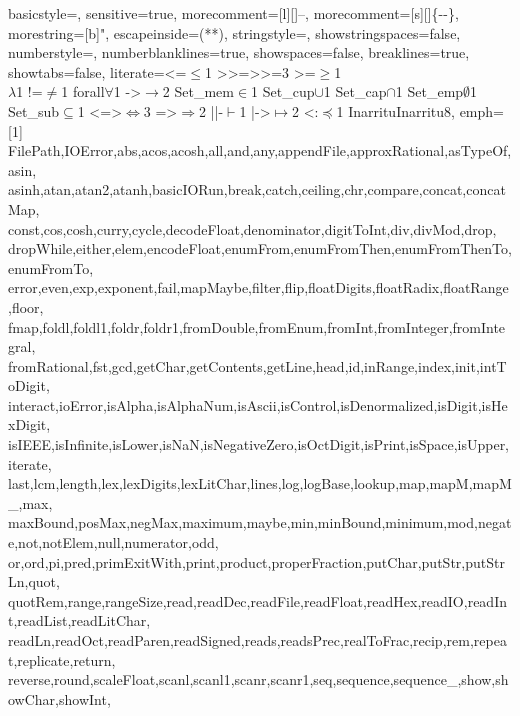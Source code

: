  {
	basicstyle=\ttfamily\codesize,
	sensitive=true,
	morecomment=[l][\color{gray_ulisses}\ttfamily\codesize]{--},
	morecomment=[s][\color{gray_ulisses}\ttfamily\codesize]{\{-}{-\}},
	morestring=[b]",
  escapeinside={(*}{*)},
	stringstyle=\color{haskellstr},
	showstringspaces=false,
	numberstyle=\codesize,
	numberblanklines=true,
	showspaces=false,
	breaklines=true,
	showtabs=false,
  literate={<=}{{$\leq$}}1
           {>>=}{{>>=}}3
           {>=}{{$\geq$}}1
           {\\}{{$\lambda$}}1
           {!=}{{$\neq$}}1
           {forall}{{$\forall$}}1
           {->}{{$\rightarrow$}}2
           {Set_mem}{{$\in$}}1
           {Set_cup}{{$\cup$}}1
           {Set_cap}{{$\cap$}}1
           {Set_emp}{{$\emptyset$}}1
           {Set_sub}{{$\subseteq$}}1
           {<=>}{{$\Leftrightarrow$}}3
           {=>}{{$\Rightarrow$}}2
           {||-}{{$\vdash$}}1
           {|->}{{$\mapsto$}}2
           {<:}{{$\preceq$}}1
           {Inarritu}{Inarritu}8,  
	emph=
	{[1]
		FilePath,IOError,abs,acos,acosh,all,and,any,appendFile,approxRational,asTypeOf,asin,
		asinh,atan,atan2,atanh,basicIORun,break,catch,ceiling,chr,compare,concat,concatMap,
		const,cos,cosh,curry,cycle,decodeFloat,denominator,digitToInt,div,divMod,drop,
		dropWhile,either,elem,encodeFloat,enumFrom,enumFromThen,enumFromThenTo,enumFromTo,
		error,even,exp,exponent,fail,mapMaybe,filter,flip,floatDigits,floatRadix,floatRange,floor,
		fmap,foldl,foldl1,foldr,foldr1,fromDouble,fromEnum,fromInt,fromInteger,fromIntegral,
		fromRational,fst,gcd,getChar,getContents,getLine,head,id,inRange,index,init,intToDigit,
		interact,ioError,isAlpha,isAlphaNum,isAscii,isControl,isDenormalized,isDigit,isHexDigit,
		isIEEE,isInfinite,isLower,isNaN,isNegativeZero,isOctDigit,isPrint,isSpace,isUpper,iterate,
		last,lcm,length,lex,lexDigits,lexLitChar,lines,log,logBase,lookup,map,mapM,mapM_,max,
		maxBound,posMax,negMax,maximum,maybe,min,minBound,minimum,mod,negate,not,notElem,null,numerator,odd,
		or,ord,pi,pred,primExitWith,print,product,properFraction,putChar,putStr,putStrLn,quot,
		quotRem,range,rangeSize,read,readDec,readFile,readFloat,readHex,readIO,readInt,readList,readLitChar,
		readLn,readOct,readParen,readSigned,reads,readsPrec,realToFrac,recip,rem,repeat,replicate,return,
		reverse,round,scaleFloat,scanl,scanl1,scanr,scanr1,seq,sequence,sequence_,show,showChar,showInt,
}}
